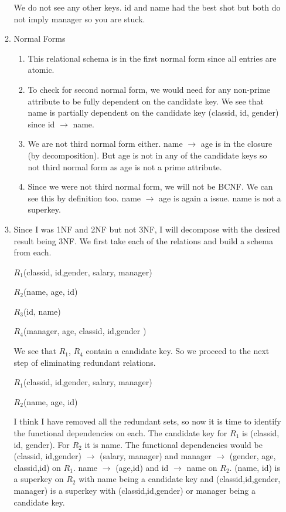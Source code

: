 \documentclass[11pt]{article}
\begin{document}
\begin{enumerate}
\begin{enumerate}
We do not see any other keys.  id and name had the best shot but both do not imply manager so you are stuck.
\item Normal Forms
\begin{enumerate}
\item This relational schema is in the first normal form since all entries are atomic.
\item To check for second normal form, we would need for any non-prime attribute to be fully dependent on the candidate key.  We see that name is partially dependent on the candidate key (classid, id, gender) since id $\rightarrow$ name.
\item We are not third normal form either.  name $\rightarrow$ age is in the closure (by decomposition).  But age is not in any of the candidate keys so not third normal form as age is not a prime attribute.
\item Since we were not third normal form, we will not be BCNF.  We can see this by definition too.  name $\rightarrow$ age is again a issue.  name is not a superkey. 
\end{enumerate}
\item Since I was 1NF and 2NF but not 3NF, I will decompose with the desired result being 3NF.  We first take each of the relations and build a schema from each. 

$R_1$(classid, id,gender, salary, manager)

$R_2$(name, age, id)

$R_3$(id, name)

$R_4$(manager, age, classid, id,gender )


We see that $R_1$, $R_4$ contain a candidate key. So we proceed to the next step of eliminating redundant relations.

$R_1$(classid, id,gender, salary, manager)

$R_2$(name, age, id)


I think I have removed all the redundant sets, so now it is time to identify the functional dependencies on each.  The candidate key for $R_1$ is (classid, id, gender).  For $R_2$ it is name.  The functional dependencies would be (classid, id,gender) $\rightarrow$ (salary, manager) and manager $\rightarrow$ (gender, age, classid,id) on $R_1$. name $\rightarrow$ (age,id) and id $\rightarrow$ name on $R_2$.  (name, id) is a superkey on $R_2$ with name being a candidate key and (classid,id,gender, manager) is a superkey with (classid,id,gender) or manager being a candidate key.



\end{enumerate}
\end{enumerate}
\end{document}
